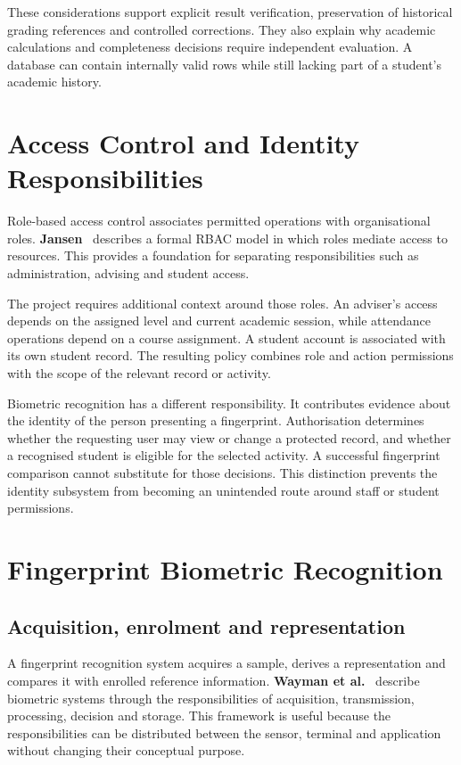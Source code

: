 These considerations support explicit result verification, preservation of historical grading references and controlled corrections. They also explain why academic calculations and completeness decisions require independent evaluation. A database can contain internally valid rows while still lacking part of a student's academic history.

\section{Access Control and Identity Responsibilities}\label{sec:2-4}

Role-based access control associates permitted operations with organisational roles. \textbf{Jansen}~\cite{jansen1998} describes a formal RBAC model in which roles mediate access to resources. This provides a foundation for separating responsibilities such as administration, advising and student access.

The project requires additional context around those roles. An adviser's access depends on the assigned level and current academic session, while attendance operations depend on a course assignment. A student account is associated with its own student record. The resulting policy combines role and action permissions with the scope of the relevant record or activity.

Biometric recognition has a different responsibility. It contributes evidence about the identity of the person presenting a fingerprint. Authorisation determines whether the requesting user may view or change a protected record, and whether a recognised student is eligible for the selected activity. A successful fingerprint comparison cannot substitute for those decisions. This distinction prevents the identity subsystem from becoming an unintended route around staff or student permissions.

\section{Fingerprint Biometric Recognition}\label{sec:2-5}

\subsection{Acquisition, enrolment and representation}\label{sec:2-5-1}

A fingerprint recognition system acquires a sample, derives a representation and compares it with enrolled reference information. \textbf{Wayman et al.}~\cite[Chapter 1]{wayman2005} describe biometric systems through the responsibilities of acquisition, transmission, processing, decision and storage. This framework is useful because the responsibilities can be distributed between the sensor, terminal and application without changing their conceptual purpose.

